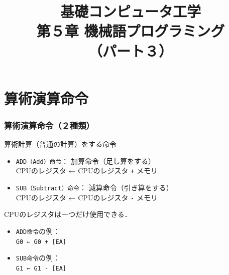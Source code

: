\documentclass{beamer}                 %
\begin{document}
\title{基礎コンピュータ工学\\第５章 機械語プログラミング\\（パート３）}
\date{}

\begin{frame}
  \titlepage
\end{frame}


\section{算術演算命令}
\begin{frame}
  \frametitle{算術演算命令（２種類）}
  算術計算（普通の計算）をする命令
  \begin{itemize}
  \item \texttt{ADD（Add）命令}： 加算命令（足し算をする） \\
    CPUのレジスタ ← CPUのレジスタ \texttt{+} メモリ
  \item \texttt{SUB（Subtract）命令}： 減算命令（引き算をする） \\
    CPUのレジスタ ← CPUのレジスタ \texttt{-} メモリ
  \end{itemize}
  \vfill
  CPUのレジスタは一つだけ使用できる．\\
  \begin{itemize}
  \item \texttt{ADD命令}の例：\\
    \texttt{G0 ← G0 + [EA]}
  \item \texttt{SUB命令}の例：\\
    \texttt{G1 ← G1 - [EA]}
  \end{itemize}
\end{frame}
\end{document}
